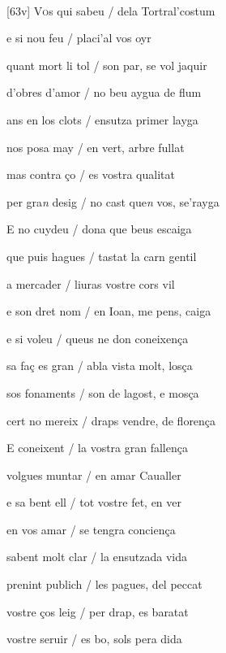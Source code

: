 \documentclass[12pt]{article}
\renewcommand{\espaiAbansEtiquetaPoema}{\vspace{0ex}}
\begin{document}
\begin{estrofa}

\espaiAbansEtiquetaPoema

\\

\end{estrofa}


\begin{estrofa}

 [63v] V\textsc{o}s qui sabeu / dela Tortral'costum

 e si nou feu / placi'al vos oyr

 quant mort li tol / son par, se vol jaquir

 d'obres d'amor / no beu aygua de flum

 ans en los clots / ensutza primer layga

 nos posa may / en vert, arbre fullat

 mas contra \c{c}o / es vostra qualitat

 per gra\textit{n} desig / no cast que\textit{n} vos, se'rayga

\end{estrofa}



\begin{estrofa}

 E no cuydeu / dona que beus escaiga

 que puis hagues / tastat la carn gentil

 a mercader / liuras vostre cors vil

 e son dret nom / en Ioan, me pens, caiga

 e si voleu / queus ne don coneixen\c{c}a

 sa fa\c{c} es gran / abla vista molt, los\c{c}a

 sos fonaments / son de lagost, e mos\c{c}a

 cert no mereix / draps vendre, de floren\c{c}a

\end{estrofa}



\begin{estrofa}

 E coneixent / la vostra gran fallen\c{c}a

 volgues muntar / en amar Caualler

 e sa bent ell / tot vostre fet, en ver

 en vos amar / se tengra concien\c{c}a

 sabent molt clar / la ensutzada vida

 prenint publich / les pagues, del peccat

 vostre \c{c}os leig / per drap, es baratat

 vostre seruir / es bo, sols pera dida

\end{estrofa}
\end{document}
